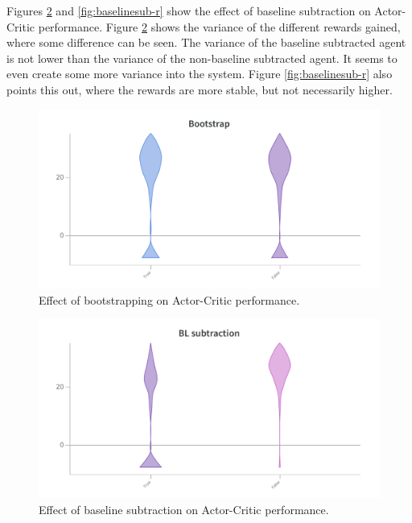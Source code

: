 \documentclass{article}
\begin{document}
Figures \ref{fig:baselinesub-v} and \ref{fig:baselinesub-r} show the effect of baseline subtraction on Actor-Critic performance.
Figure \ref{fig:baselinesub-v} shows the variance of the different rewards gained, where some difference can be seen.
The variance of the baseline subtracted agent is not lower than the variance of the non-baseline subtracted agent.
It seems to even create some more variance into the system.
Figure \ref{fig:baselinesub-r} also points this out, where the rewards are more stable, but not necessarily higher.

\begin{figure}[htbp]
    \centering
    \includegraphics[width=\linewidth]{figs/bootstrap-V.png}
    \caption{Effect of bootstrapping on Actor-Critic performance.}
    \label{fig:bootstrap-v}
\end{figure}

\begin{figure}[htbp]
    \centering
    \includegraphics[width=\linewidth]{figs/baseline-V.png}
    \caption{Effect of baseline subtraction on Actor-Critic performance.}
    \label{fig:baselinesub-v}
\end{figure}
\end{document}
